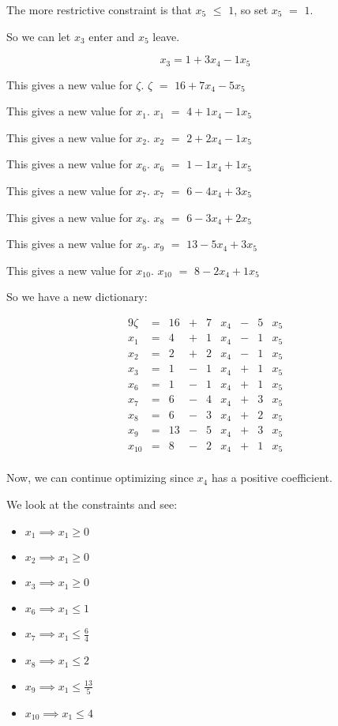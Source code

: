 \documentclass[12pt,letterpaper]{article}
\newcommand*\seeconstraints{
  We look at the constraints and see:
}
\newcommand*\continueopt[1]{
  Now, we can continue optimizing since #1 has a positive coefficient.
}
\newcommand*\enterleave[2]{
  So we can let #1 enter and #2 leave.
}
\newcommand*\morerestrictive[2]{
  The more restrictive constraint is that #1 $\leq$ #2, so set #1 $=$ #2.
}
\newcommand*\newdict{
  So we have a new dictionary:
}
\newcommand*\newvalue[2]{
  This gives a new value for #1. #1 $ = $ #2
}
\begin{document}
\begin{enumerate}
      \morerestrictive{$x_5$}{$1$}

      \enterleave{$x_3$}{$x_5$}

      \[
        x_3 = 1 + 3 x_4 - 1 x_5
      \]

      \newvalue{$\zeta$}{$16 + 7 x_4 - 5 x_5$}

      \newvalue{$x_1$}{$4  + 1 x_4 - 1 x_5$}

      \newvalue{$x_2$}{$2  + 2 x_4 - 1 x_5$}

      \newvalue{$x_6$}{$1  - 1 x_4 + 1 x_5$}

      \newvalue{$x_7$}{$6  - 4 x_4 + 3 x_5$}

      \newvalue{$x_8$}{$6  - 3 x_4 + 2 x_5$}

      \newvalue{$x_9$}{$13 - 5 x_4 + 3 x_5$}

      \newvalue{$x_{10}$}{$8 - 2 x_4 + 1 x_5$}

      \newdict

      \begin{alignat*}{9}
        \zeta  & {}={} & 16 & {}+{} & 7 & x_4 & {}-{} & 5 & x_5 \\
        x_1    & {}={} & 4  & {}+{} & 1 & x_4 & {}-{} & 1 & x_5 \\
        x_2    & {}={} & 2  & {}+{} & 2 & x_4 & {}-{} & 1 & x_5 \\
        x_3    & {}={} & 1  & {}-{} & 1 & x_4 & {}+{} & 1 & x_5 \\
        x_6    & {}={} & 1  & {}-{} & 1 & x_4 & {}+{} & 1 & x_5 \\
        x_7    & {}={} & 6  & {}-{} & 4 & x_4 & {}+{} & 3 & x_5 \\
        x_8    & {}={} & 6  & {}-{} & 3 & x_4 & {}+{} & 2 & x_5 \\
        x_9    & {}={} & 13 & {}-{} & 5 & x_4 & {}+{} & 3 & x_5 \\
        x_{10} & {}={} & 8  & {}-{} & 2 & x_4 & {}+{} & 1 & x_5 \\
      \end{alignat*}

      \continueopt{$x_4$}

      \seeconstraints

      \begin{itemize}
        \item $x_1    \implies x_1 \geq 0$
        \item $x_2    \implies x_1 \geq 0$
        \item $x_3    \implies x_1 \geq 0$
        \item $x_6    \implies x_1 \leq 1$
        \item $x_7    \implies x_1 \leq \frac{6}{4}$
        \item $x_8    \implies x_1 \leq 2$
        \item $x_9    \implies x_1 \leq \frac{13}{5}$
        \item $x_{10} \implies x_1 \leq 4$
      \end{itemize}


\end{enumerate}
\end{document}
